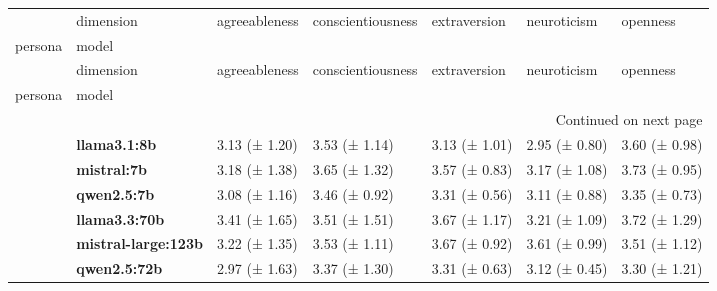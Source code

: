 \begin{longtable}{lllllll}
\toprule
 & dimension & agreeableness & conscientiousness & extraversion & neuroticism & openness \\
persona & model &  &  &  &  &  \\
\midrule
\endfirsthead
\toprule
 & dimension & agreeableness & conscientiousness & extraversion & neuroticism & openness \\
persona & model &  &  &  &  &  \\
\midrule
\endhead
\midrule
\multicolumn{7}{r}{Continued on next page} \\
\midrule
\endfoot
\bottomrule
\endlastfoot
\multirow[t]{6}{*}{\textbf{base}} & \textbf{llama3.1:8b} & 3.13 (± 1.20) & 3.53 (± 1.14) & 3.13 (± 1.01) & 2.95 (± 0.80) & 3.60 (± 0.98) \\
\textbf{} & \textbf{mistral:7b} & 3.18 (± 1.38) & 3.65 (± 1.32) & 3.57 (± 0.83) & 3.17 (± 1.08) & 3.73 (± 0.95) \\
\textbf{} & \textbf{qwen2.5:7b} & 3.08 (± 1.16) & 3.46 (± 0.92) & 3.31 (± 0.56) & 3.11 (± 0.88) & 3.35 (± 0.73) \\
\textbf{} & \textbf{llama3.3:70b} & 3.41 (± 1.65) & 3.51 (± 1.51) & 3.67 (± 1.17) & 3.21 (± 1.09) & 3.72 (± 1.29) \\
\textbf{} & \textbf{mistral-large:123b} & 3.22 (± 1.35) & 3.53 (± 1.11) & 3.67 (± 0.92) & 3.61 (± 0.99) & 3.51 (± 1.12) \\
\textbf{} & \textbf{qwen2.5:72b} & 2.97 (± 1.63) & 3.37 (± 1.30) & 3.31 (± 0.63) & 3.12 (± 0.45) & 3.30 (± 1.21) \\
\cline{1-7}
\end{longtable}
